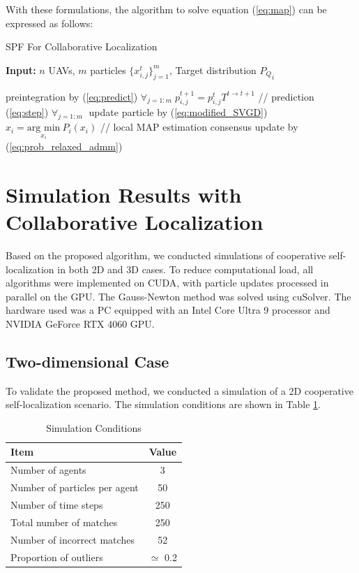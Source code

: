 \documentclass[a4paper,fleqn,10pt,twocolumn]{SICE_ISCS}
\begin{document}
With these formulations, the algorithm to solve equation (\ref{eq:map}) can be expressed as follows:

\begin{algorithm}[h]
\caption{SPF For Collaborative Localization}\label{alg:dspf}

\begin{algorithmic}[1]
\STATE \textbf{Input:} $n$ UAVs, $m$ particles $\{x^t_{i,j}\}^m_{j=1}$, Target distribution ${P_Q}_i$

\STATE preintegration by (\ref{eq:predict})
\ENDFOR
\STATE $\forall_{j=1:m}\; p^{t+1}_{i,j} = p^{t}_{i,j} T^{t \rightarrow {t+1}}$  // prediction (\ref{eq:step})
\STATE $\forall_{j=1:m}\;$ update particle by (\ref{eq:modified_SVGD})
\STATE $x_i = \underset{x_i}{\text{arg min}}\: {P_i(x_i)}$ // local MAP estimation
\STATE consensus update by (\ref{eq:prob_relaxed_admm})
\ENDFOR
\end{algorithmic}
\end{algorithm}

\section{Simulation Results with Collaborative Localization}

Based on the proposed algorithm, we conducted simulations of cooperative self-localization in both 2D and 3D cases. To reduce computational load, all algorithms were implemented on CUDA, with particle updates processed in parallel on the GPU. The Gauss-Newton method was solved using cuSolver. The hardware used was a PC equipped with an Intel Core Ultra 9 processor and NVIDIA GeForce RTX 4060 GPU.

\subsection{Two-dimensional Case}

To validate the proposed method, we conducted a simulation of a 2D cooperative self-localization scenario. The simulation conditions are shown in Table \ref{tb:sim1}.

\begin{table}[h]
\caption{Simulation Conditions}
  \centering
  \begin{tabular}{l|c} \hline
    Item & Value  \\ \hline
    Number of agents & 3  \\
    Number of particles per agent & 50  \\ 
    Number of time steps & 250 \\
    Total number of matches & 250 \\ 
    Number of incorrect matches & 52 \\
    Proportion of outliers & $\simeq$ 0.2 \\ \hline
  \end{tabular}
  \label{tb:sim1}
\end{table}
\end{document}

